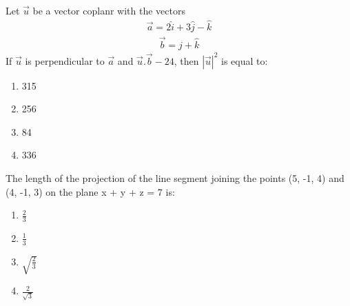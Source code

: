 \item Let $\overrightarrow{u}$ be a vector coplanr with the vectors 
\begin{align*}
\overrightarrow{a} = 2\hat{i} + 3\hat{j} - \hat{k}
\end{align*}
\begin{align*} 
\overrightarrow{b} = \hat{j} + \hat{k}
\end{align*}
If $\overrightarrow{u}$ is perpendicular to $\overrightarrow{a}$ and 
$\overrightarrow{u}.\overrightarrow{b} - 24$, then $|\overrightarrow{u}|^2$ is equal to:
\begin{enumerate}
\item 315
\item 256
\item 84
\item 336
\end{enumerate} 

\item The length of the projection of the line segment joining the points (5, -1, 4) and (4, -1, 3) on the plane x + y + z = 7 is:
\begin{enumerate}
\item $\frac{2}{3}$
\item $\frac{1}{3}$
\item $\sqrt{\frac{2}{3}}$
\item $\frac{2}{\sqrt{3}}$
\end{enumerate}

